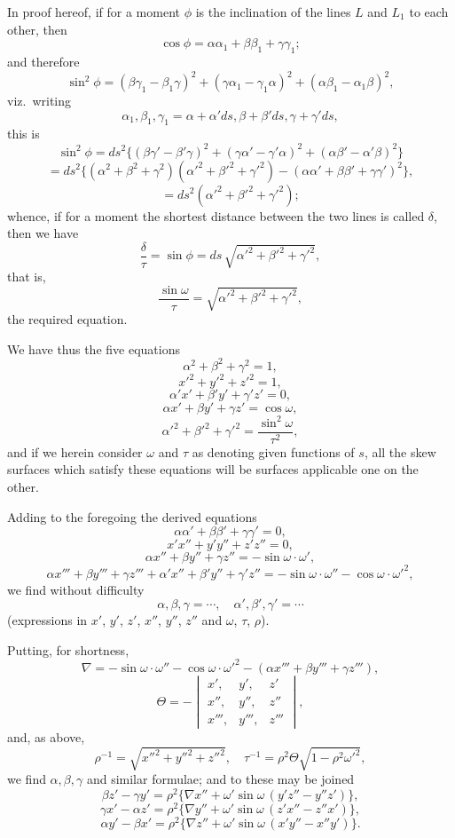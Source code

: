 \documentclass[11pt,a4paper]{article}
\begin{document}
In proof hereof, if for a moment $\phi$ is the inclination of the lines $L$ and $L_1$ to each other, then
\[
\cos\phi = \alpha\alpha_1 + \beta\beta_1 + \gamma\gamma_1;
\]
and therefore
\[
\sin^2\phi = (\beta\gamma_1 - \beta_1 \gamma)^2 + (\gamma\alpha_1 - \gamma_1 \alpha)^2 + (\alpha\beta_1 - \alpha_1 \beta)^2,
\]
viz.\ writing
\[
\alpha_1, \beta_1, \gamma_1 = \alpha + \alpha' ds, \beta + \beta' ds, \gamma + \gamma' ds,
\]
this is
\[
\sin^2\phi = ds^2 \{(\beta\gamma' - \beta'\gamma)^2 + (\gamma\alpha' - \gamma'\alpha)^2 + (\alpha\beta' - \alpha'\beta)^2\}
\]
\[
= ds^2 \{(\alpha^2 + \beta^2 + \gamma^2)(\alpha'^2 + \beta'^2 + \gamma'^2) - (\alpha\alpha' + \beta\beta' + \gamma\gamma')^2\},
\]
\[
= ds^2 (\alpha'^2 + \beta'^2 + \gamma'^2);
\]
whence, if for a moment the shortest distance between the two lines is called $\delta$, then we have
\[
\frac{\delta}{\tau} = \sin\phi = ds\,\sqrt{\alpha'^2 + \beta'^2 + \gamma'^2},
\]
that is,
\[
\frac{\sin\omega}{\tau} = \sqrt{\alpha'^2 + \beta'^2 + \gamma'^2},
\]
the required equation.

We have thus the five equations
\[
\alpha^2 + \beta^2 + \gamma^2 = 1,
\]
\[
x'^2 + y'^2 + z'^2 = 1,
\]
\[
\alpha' x' + \beta' y' + \gamma' z' = 0,
\]
\[
\alpha x' + \beta y' + \gamma z' = \cos\omega,
\]
\[
\alpha'^2 + \beta'^2 + \gamma'^2 = \frac{\sin^2\omega}{\tau^2},
\]
and if we herein consider $\omega$ and $\tau$ as denoting given functions of $s$, all the skew surfaces which satisfy these equations will be surfaces applicable one on the other.

Adding to the foregoing the derived equations
\[
\alpha\alpha' + \beta\beta' + \gamma\gamma' = 0,
\]
\[
x' x'' + y' y'' + z' z'' = 0,
\]
\[
\alpha x'' + \beta y'' + \gamma z'' = -\sin\omega\cdot \omega',
\]
\[
\alpha x''' + \beta y''' + \gamma z''' + \alpha' x'' + \beta' y'' + \gamma' z'' = -\sin\omega\cdot\omega'' - \cos\omega\cdot\omega'^2,
\]
we find without difficulty
\[
\alpha,\beta,\gamma = \cdots,\quad \alpha',\beta',\gamma' = \cdots
\]
(expressions in $x'$, $y'$, $z'$, $x''$, $y''$, $z''$ and $\omega$, $\tau$, $\rho$).

Putting, for shortness,
\[
\nabla = -\sin\omega\cdot\omega'' - \cos\omega\cdot\omega'^2 - (\alpha x''' + \beta y''' + \gamma z'''),
\]
\[
\Theta = -\begin{vmatrix} x', & y', & z' \\ x'', & y'', & z'' \\ x''', & y''', & z''' \end{vmatrix},
\]
and, as above,
\[
\rho^{-1} = \sqrt{x''^2 + y''^2 + z''^2},\quad \tau^{-1} = \rho^2 \Theta\sqrt{1 - \rho^2 \omega'^2},
\]
we find $\alpha,\beta,\gamma$ and similar formulae; and to these may be joined
\[
\beta z' - \gamma y' = \rho^2 \{\nabla x'' + \omega' \sin\omega\,(y' z'' - y'' z')\},
\]
\[
\gamma x' - \alpha z' = \rho^2 \{\nabla y'' + \omega' \sin\omega\,(z' x'' - z'' x')\},
\]
\[
\alpha y' - \beta x' = \rho^2 \{\nabla z'' + \omega' \sin\omega\,(x' y'' - x'' y')\}.
\]
\end{document}
